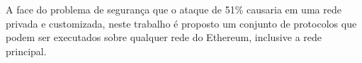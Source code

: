 \documentclass[tcc,capa]{texufpel}
\begin{document}
    A face do problema de segurança que o ataque de 51\% causaria em uma rede privada e customizada, neste trabalho é proposto um conjunto de protocolos que podem ser executados sobre qualquer rede do Ethereum, inclusive a rede principal.
	

    
        
    
    
    
    
\end{document}
